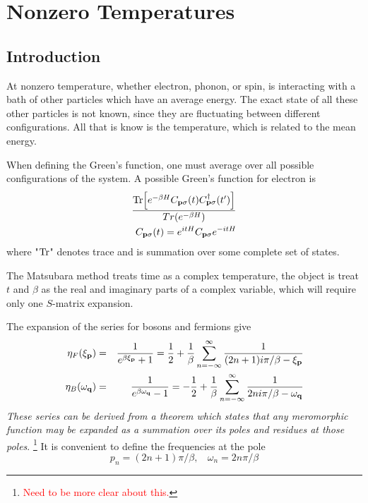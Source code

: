 \chapter{Nonzero Temperatures}

\section{Introduction}\label{s3.1}
At nonzero temperature, whether electron, phonon, or spin, is interacting with a bath of other particles which have an average energy.
The exact state of all these other particles is not known, since they are fluctuating between different configurations.
All that is know is the temperature, which is related to the mean energy.


When defining the Green's function, one must average over all possible configurations of the system. A possible Green's function for electron is
\begin{eqnarray}
  \frac{\Tr[e^{-\beta H} C_{\mathbf{p} \sigma}(t) C^\dagger_{\mathbf{p} \sigma}(t')]}{Tr(e^{-\beta H})}  \label{3.1} \\
  C_{\mathbf{p} \sigma}(t) = e^{itH}C_{\mathbf{p}\sigma}e^{-itH}  \label{3.2}
\end{eqnarray}
where "$\Tr$" denotes trace and is summation over some complete set of states.

The Matsubara method treats time as a complex temperature, the object is treat $t$ and $\beta$ as the real and imaginary parts of a complex variable, which will require only one $S$-matrix expansion.

The expansion of the series for bosons and fermions give
\begin{eqnarray}
  \eta_F(\xi_{\mathbf{p}}) &=& \frac{1}{e^{\beta \xi_{\mathbf{p}}}+1} = \frac{1}{2} + \frac{1}{\beta} \sum_{n=-\infty}^\infty \frac{1}{(2n+1)i\pi/\beta -\xi_{\mathbf{p}}} \label{3.5} \\
  \eta_B(\omega_{\mathbf{q}}) &=& \frac{1}{e^{\beta \omega_{\mathbf{q}}}-1} = -\frac{1}{2} + \frac{1}{\beta} \sum_{n=-\infty}^\infty \frac{1}{2ni\pi/\beta -\omega_{\mathbf{q}}} \label{3.6}
\end{eqnarray}
\textit{These series can be derived from a theorem which states that any meromorphic function may be expanded as a summation over its poles and residues at those poles}. \footnote{\textcolor{red}{Need to be more clear about this.}}
It is convenient to define the frequencies at the pole
\begin{equation}
  p_n = (2n+1)\pi/\beta,~ ~ ~ ~ \omega_n = 2n\pi/\beta \label{3.7}
\end{equation}

